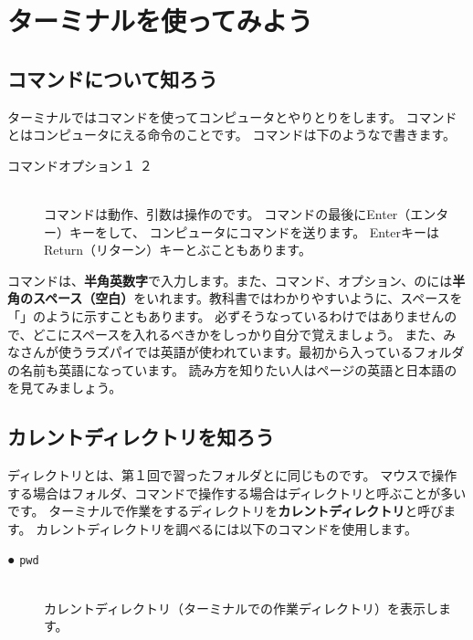 
\section{ターミナルを使ってみよう}
\subsection{コマンドについて知ろう}

ターミナルではコマンドを使ってコンピュータとやりとりをします。
コマンドとはコンピュータにえる命令のことです。
コマンドは下のようなで書きます。

\begin{description}
\item[コマンド\textvisiblespace オプション\textvisiblespace {}１\textvisiblespace 
{}２]\mbox{}\\
コマンドは動作、引数は操作のです。
 コマンドの最後にEnter（エンター）キーをして、
 コンピュータにコマンドを送ります。
 EnterキーはReturn（リターン）キーとぶこともあります。
\end{description}

コマンドは、{\bf 半角英数字}で入力します。また、コマンド、オプション、のには{\bf 半角のスペース（空白）}をいれます。教科書ではわかりやすいように、スペースを「\textvisiblespace 」のように示すこともあります。
必ずそうなっているわけではありませんので、どこにスペースを入れるべきかをしっかり自分で覚えましょう。
また、みなさんが使うラズパイでは英語が使われています。最初から入っているフォルダの名前も英語になっています。
読み方を知りたい人は\pageref{英語と日本語の対応表}ページの英語と日本語のを見てみましょう。

\subsection{カレントディレクトリを知ろう}
ディレクトリとは、第１回で習ったフォルダとに同じものです。
マウスで操作する場合はフォルダ、コマンドで操作する場合はディレクトリと呼ぶことが多いです。
ターミナルで作業をするディレクトリを{\bf カレントディレクトリ}と呼びます。
カレントディレクトリを調べるには以下のコマンドを使用します。

\begin{description}
\item[● \texttt{pwd}]\mbox{}\\
 カレントディレクトリ（ターミナルでの作業ディレクトリ）を表示します。
\end{description}


